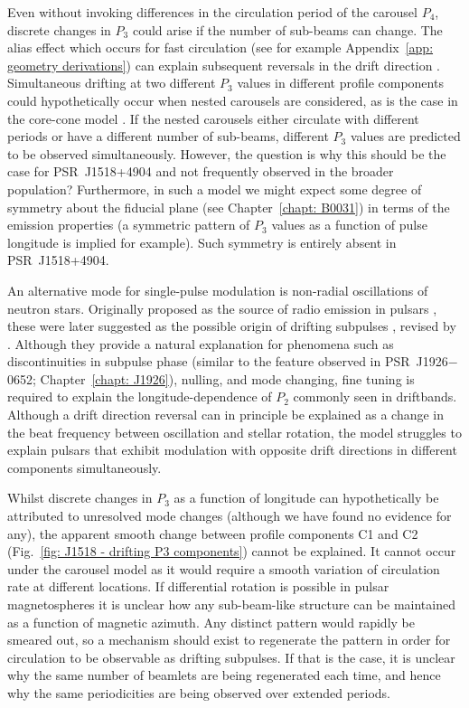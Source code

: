 Even without invoking differences in the circulation period of the carousel $P_4$, discrete changes in $P_3$ could arise if the number of sub-beams can change. The alias effect which occurs for fast circulation (see for example Appendix~\ref{app: geometry derivations}) can explain subsequent reversals in the drift direction \citep[e.g.][]{Wxxx2007}. Simultaneous drifting at two different $P_3$ values in different profile components could hypothetically occur when nested carousels are considered, as is the case in the core-cone model \citep[e.g.][]{Rxxx1983a, Kxxx1994, GGxx2003}. If the nested carousels either circulate with different periods or have a different number of sub-beams, different $P_3$ values are predicted to be observed simultaneously. However, the question is why this should be the case for PSR~J1518+4904 and not frequently observed in the broader population? Furthermore, in such a model we might expect some degree of symmetry about the fiducial plane (see Chapter~\ref{chapt: B0031}) in terms of the emission properties (a symmetric pattern of $P_3$ values as a function of pulse longitude is implied for example). Such symmetry is entirely absent in PSR~J1518+4904. 

An alternative mode for single-pulse modulation is non-radial oscillations of neutron stars. Originally proposed as the source of radio emission in pulsars \citep{Rxxx1968}, these were later suggested as the possible origin of drifting subpulses \citep{DCxx1968}, revised by \citet{CRxx2004}. Although they provide a natural explanation for phenomena such as discontinuities in subpulse phase (similar to the feature observed in PSR~J1926$-$0652; Chapter~\ref{chapt: J1926}), nulling, and mode changing, fine tuning is required to explain the longitude-dependence of $P_2$ commonly seen in driftbands.  Although a drift direction reversal can in principle be explained as a change in the beat frequency between oscillation and stellar rotation, the model struggles to explain pulsars that exhibit modulation with opposite drift directions in different components simultaneously.

Whilst discrete changes in $P_3$ as a function of longitude can hypothetically be attributed to unresolved mode changes (although we have found no evidence for any), the apparent smooth change between profile components C1 and C2 (Fig.~\ref{fig: J1518 - drifting P3 components}) cannot be explained. It cannot occur under the carousel model as it would require a smooth variation of circulation rate at different locations. If differential rotation is possible in pulsar magnetospheres it is unclear how any sub-beam-like structure can be maintained as a function of magnetic azimuth. Any distinct pattern would rapidly be smeared out, so a mechanism should exist to regenerate the pattern in order for circulation to be observable as drifting subpulses. If that is the case, it is unclear why the same number of beamlets are being regenerated each time, and hence why the same periodicities are being observed over extended periods.



